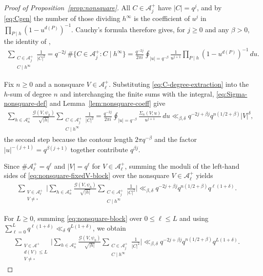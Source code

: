 \documentclass[a4paper,reqno]{amsart}
\numberwithin{equation}{section}
\theoremstyle{remark}
\theoremstyle{definition}
\newcommand{\A}{\mathcal{A}}
\newcommand{\Gc}{\mathcal{G}}
\begin{document}
\begin{proof}[Proof of Proposition~\ref{prop:nonsquare}]
All $C\in\A_j^+$ have $|C|=q^j$, and by \eqref{eq:Cgen} the number of those
dividing $h^\infty$ is the coefficient of $u^j$ in
$\prod_{P\mid h}(1-u^{d(P)})^{-1}$. Cauchy's formula therefore gives, for
$j\ge0$ and any $\beta>0$, the identity of \cite[Section~7]{Fl17-1},
\begin{align}\label{eq:C-degree-extraction}
\sum_{\substack{C\in\A_j^+\\ C\mid h^\infty}}\frac{1}{|C|^2}
=q^{-2j}\,\#\bigl\{C\in\A_j^+:C\mid h^\infty\bigr\}
=\frac{q^{-2j}}{2\pi i}
\oint_{|u|=q^{-\beta}}
\frac{1}{u^{j+1}}
\prod_{P\mid h}
\left(1-u^{d(P)}\right)^{-1}
\,du.
\end{align}

Fix $n\ge0$ and a nonsquare $V\in\A_\ell^+$. Substituting
\eqref{eq:C-degree-extraction} into the $h$-sum of degree $n$ and
interchanging the finite sums with the integral, \eqref{eq:Sigma-nonsquare-def}
and Lemma~\ref{lem:nonsquare-coeff} give
\begin{align}\label{eq:nonsquare-fixedV-block}
\sum_{h\in\A_n^+}\frac{\Gc(V,\psi_h)}{\sqrt{|h|}}
\sum_{\substack{C\in\A_j^+\\ C\mid h^\infty}}\frac{1}{|C|^2}
=\frac{q^{-2j}}{2\pi i}\oint_{|u|=q^{-\beta}}
\frac{\Sigma_n(V;u)}{u^{j+1}}\,du
\ll_{\beta,\delta}q^{-2j+\beta j}q^{n(1/2+\beta)}|V|^\delta,
\end{align}
the second step because the contour length $2\pi q^{-\beta}$ and the factor
$|u|^{-(j+1)}=q^{\beta(j+1)}$ together contribute $q^{\beta j}$.

Since $\#\A_\ell^+=q^\ell$ and $|V|=q^\ell$ for $V\in\A_\ell^+$, summing the
moduli of the left-hand sides of \eqref{eq:nonsquare-fixedV-block} over the
nonsquare $V\in\A_\ell^+$ yields
\begin{align}
\sum_{\substack{V\in\A_\ell^+\\ V\ne\square}}
\Biggl|
\sum_{h\in\A_n^+}
\frac{\Gc(V,\psi_h)}{\sqrt{|h|}}
\sum_{\substack{C\in\A_j^+\\ C\mid h^\infty}}
\frac{1}{|C|^2}
\Biggr|
\ll_{\beta,\delta}
q^{-2j+\beta j}
q^{n(1/2+\beta)}
q^{\ell(1+\delta)}.
\label{eq:nonsquare-block}
\end{align}

For $L\ge0$, summing \eqref{eq:nonsquare-block} over
$0\le\ell\le L$ and using
$\sum_{\ell=0}^{L}q^{\ell(1+\delta)} \ll_\delta q^{L(1+\delta)}$,
we obtain
\begin{align}
\sum_{\substack{V\in\A^+\\ d(V)\le L\\ V\ne\square}}
\Biggl|
\sum_{h\in\A_n^+}
\frac{\Gc(V,\psi_h)}{\sqrt{|h|}}
\sum_{\substack{C\in\A_j^+\\ C\mid h^\infty}}
\frac{1}{|C|^2}
\Biggr|
\ll_{\beta,\delta}
q^{-2j+\beta j}
q^{n(1/2+\beta)}
q^{L(1+\delta)}.
\label{eq:nonsquare-block-cumulative}
\end{align}


\end{proof}
\end{document}
